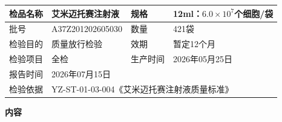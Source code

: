 \documentclass[UTF8,10pt,a4paper,fontset=fandol]{ctexart}
\newcommand{\fieldvalue}[1]{#1}
\begin{document}
\begin{tabular}{|p{2.2cm}|p{5.0cm}|p{1.8cm}|p{4.0cm}|}
\hline
检品名称 &
\fieldvalue{艾米迈托赛注射液} &
规格 &
\fieldvalue{12ml：$6.0\times10^{7}$个细胞/袋}
\\ \hline
批号 &
\fieldvalue{A37Z201202605030} &
数量 &
\fieldvalue{421袋}
\\ \hline
检验目的 &
\fieldvalue{质量放行检验} &
效期 &
\fieldvalue{暂定12个月}
\\ \hline
检验项目 &
\fieldvalue{全检} &
生产时间 &
\fieldvalue{2026年05月25日}
\\ \hline
报告时间 &
\fieldvalue{2026年07月15日} &
\multicolumn{2}{l|}{}
\\ \hline
检验依据 &
\multicolumn{3}{l|}{
\fieldvalue{YZ-ST-01-03-004《艾米迈托赛注射液质量标准》}
}
\\ \hline
\end{tabular}

\begin{center}
\textbf{内\quad 容}
\end{center}
\end{document}
